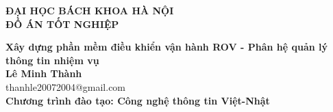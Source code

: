 \documentclass[DoAn.tex]{subfiles}
\begin{document}
\begin{titlepage}
\thispagestyle{empty}
\begin{center}

{\textbf{\large{ĐẠI HỌC BÁCH KHOA HÀ NỘI}}}\\[4cm]

{\textbf{\huge{ ĐỒ ÁN TỐT NGHIỆP}}}\\[1cm]
{\textbf{\Large{Xây dựng phần mềm điều khiển vận hành ROV - Phân hệ quản lý thông tin nhiệm vụ}}\\[1cm]

{\textbf{\large{Lê Minh Thành}}}\\
{\large{thanhle20072004@gmail.com}}\\[0.5cm]

{\textbf{\large{Chương trình đào tạo: Công nghệ thông tin Việt-Nhật
}}}\\

\vspace{4cm}
\begin{table}[H]
\centering
{}
\end{table}}
\end{center}

\end{titlepage}
\end{document}
